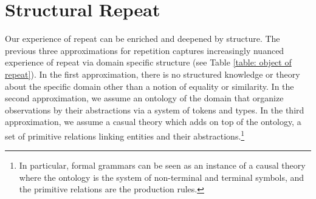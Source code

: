 







% 

\section{Structural Repeat}


Our experience of repeat can be enriched and deepened by structure. The previous three approximations for repetition captures increasingly nuanced experience of repeat via domain specific structure (see Table \ref{table: object of repeat}). In the first approximation, there is no structured knowledge or theory about the specific domain other than a notion of equality or similarity. In the second approximation, we assume an ontology of the domain that organize observations by their abstractions via a system of tokens and types. In the third approximation, we assume a casual theory which adds on top of the ontology, a set of primitive relations linking entities and their abstractions.\footnote{In particular, formal grammars can be seen as an instance of a causal theory where the ontology is the system of non-terminal and terminal symbols, and the primitive relations are the production rules.} 

